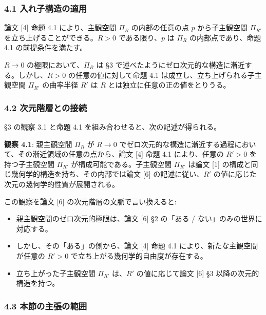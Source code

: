 \documentclass[a4paper,11pt]{ltjsarticle}
\theoremstyle{definition}
\providecommand{\tightlist}{\setlength{\itemsep}{0pt}\setlength{\parskip}{0pt}}
\begin{document}
\subsubsection{4.1
入れ子構造の適用}\label{ux5165ux308cux5b50ux69cbux9020ux306eux9069ux7528}

論文 {[}4{]} 命題 4.1 により、主観空間 \(\Pi_R\) の内部の任意の点 \(p\)
から子主観空間 \(\Pi_{R'}\) を立ち上げることができる。\(R > 0\)
である限り、\(p\) は \(\Pi_R\) の内部点であり、命題 4.1
の前提条件を満たす。

\(R \to 0\) の極限において、\(\Pi_R\) は §3
で述べたようにゼロ次元的な構造に漸近する。しかし、\(R > 0\)
の任意の値に対して命題 4.1 は成立し、立ち上げられる子主観空間
\(\Pi_{R'}\) の曲率半径 \(R'\) は \(R\)
とは独立に任意の正の値をとりうる。

\subsubsection{4.2
次元階層との接続}\label{ux6b21ux5143ux968eux5c64ux3068ux306eux63a5ux7d9a}

§3 の観察 3.1 と命題 4.1 を組み合わせると、次の記述が得られる。

\textbf{観察 4.1}: 親主観空間 \(\Pi_R\) が \(R \to 0\)
でゼロ次元的な構造に漸近する過程において、その漸近領域の任意の点から、論文
{[}4{]} 命題 4.1 により、任意の \(R' > 0\) を持つ子主観空間 \(\Pi_{R'}\)
が構成可能である。子主観空間 \(\Pi_{R'}\) は論文 {[}1{]}
の構成と同じ幾何学的構造を持ち、その内部では論文 {[}6{]}
の記述に従い、\(R'\) の値に応じた次元の幾何学的性質が展開される。

この観察を論文 {[}6{]} の次元階層の文脈で言い換えると:

\begin{itemize}
\tightlist
\item
  親主観空間のゼロ次元的極限は、論文 {[}6{]} §2 の「ある /
  ない」のみの世界に対応する。
\item
  しかし、その「ある」の側から、論文 {[}4{]} 命題 4.1
  により、新たな主観空間が任意の \(R' > 0\)
  で立ち上がる幾何学的自由度が存在する。
\item
  立ち上がった子主観空間 \(\Pi_{R'}\) は、\(R'\) の値に応じて論文
  {[}6{]} §3 以降の次元的構造を持つ。
\end{itemize}

\subsubsection{4.3
本節の主張の範囲}\label{ux672cux7bc0ux306eux4e3bux5f35ux306eux7bc4ux56f2}
\end{document}
